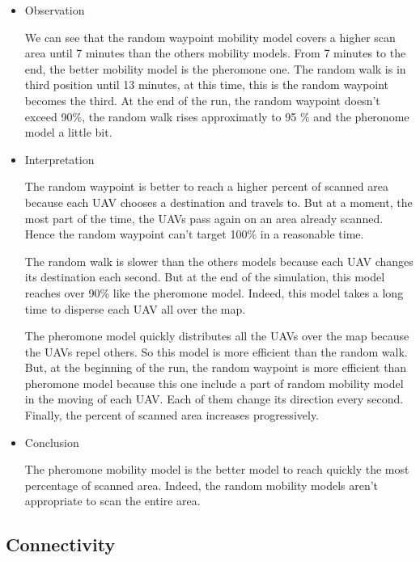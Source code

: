 \begin{itemize}

\item Observation

We can see that the random waypoint mobility model covers a higher scan area until 7 minutes than the others mobility models. From 7 minutes to the end, the better mobility model is the pheromone one. The random walk is in third position until 13 minutes, at this time, this is the random waypoint becomes the third. At the end of the run, the random waypoint doesn't exceed 90\%, the random walk rises approximatly to 95 \% and the pheronome model a little bit.

\item Interpretation

The random waypoint is better to reach a higher percent of scanned area because each UAV chooses a destination and travels to. But at a moment, the most part of the time, the UAVs pass again on an area already scanned. Hence the random waypoint can't target 100\% in a reasonable time.

The random walk is slower than the others models because each UAV changes its destination each second. But at the end of the simulation, this model reaches over 90\% like the pheromone model. Indeed, this model takes a long time to disperse each UAV all over the map.

The pheromone model quickly distributes all the UAVs over the map because the UAVs repel others. So this model is more efficient than the random walk. But, at the beginning of the run, the random waypoint is more efficient than pheromone model because this one include a part of random mobility model in the moving of each UAV. Each of them change its direction every second. Finally, the percent of scanned area increases progressively.

\item Conclusion

The pheromone mobility model is the better model to reach quickly the most percentage of scanned area. Indeed, the random mobility models aren't appropriate to scan the entire area.


\end{itemize}


\subsection{Connectivity}


